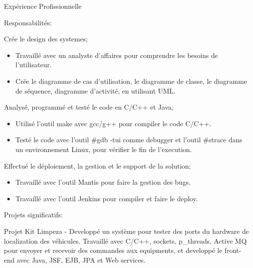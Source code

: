 \documentclass{resume}
\begin{document}
\begin{rSection}{Expérience Profissionnelle}
      \begin{rSubsection}{\fontsize{9}{10}\selectfont Responsabilités:}{}{}{}
        \item Crée le design des systemes;
          \begin{addmargin}[1em]{2em}
            \renewcommand\labelitemi{$\cdot$}
            \begin{itemize}
              \item Travaillé avec un analyste d'affaires pour comprendre les besoins de l'utilisateur.
              \item Crée le diagramme de cas d'utilisation, le diagramme de classe, le diagramme de séquence, diagramme d'activité, en utilisant UML.
            \end{itemize}
          \end{addmargin}
        \item Analysé, programmé et testé le code en C/C++ et Java;
            \begin{addmargin}[1em]{2em}
              \renewcommand\labelitemi{$\cdot$}
              \begin{itemize}
                \item Utilisé l'outil make avec gcc/g++ pour compiler le code C/C++.
                \item Testé le code avec l'outil \#gdb -tui comme debugger et l'outil \#strace dans un environnement Linux, pour vérifier le fin de l'execution. 
              \end{itemize}
            \end{addmargin}
        \item Effectué le déploiement, la gestion et le support de la solution;
            \begin{addmargin}[1em]{2em}
              \renewcommand\labelitemi{$\cdot$}
              \begin{itemize}
                \item Travaillé avec l'outil Mantis pour faire la gestion des bugs.
                \item Travaillé avec l'outil Jenkins pour compiler et faire le deploy.
              \end{itemize}
            \end{addmargin}        
      \end{rSubsection}

      \begin{rSubsection}{\fontsize{9}{10}\selectfont Projets significatifs:}{}{}{}
        \item Projet Kit Limpeza - Developpé un système pour tester des ports du hardware de localization des véhicules. Travaillé avec C/C++, sockets, p\_threads, Active MQ pour envoyer et recevoir des commandes aux equipments, et developpé le front-end avec Java, JSF, EJB, JPA et Web services.
      \end{rSubsection}


\end{rSection}
\end{document}
